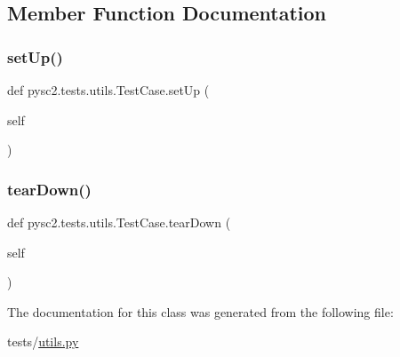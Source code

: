 \subsection{Member Function Documentation}
\mbox{\label{classpysc2_1_1tests_1_1utils_1_1_test_case_a2b119fadd4e4bc8426e9d8649bc8026b}} 
\subsubsection{\texorpdfstring{set\+Up()}{setUp()}}
{\footnotesize\ttfamily def pysc2.\+tests.\+utils.\+Test\+Case.\+set\+Up (\begin{DoxyParamCaption}\item[{}]{self }\end{DoxyParamCaption})}

\mbox{\label{classpysc2_1_1tests_1_1utils_1_1_test_case_acc0033ea0db648be45dc53eaf0dc72b7}} 
\subsubsection{\texorpdfstring{tear\+Down()}{tearDown()}}
{\footnotesize\ttfamily def pysc2.\+tests.\+utils.\+Test\+Case.\+tear\+Down (\begin{DoxyParamCaption}\item[{}]{self }\end{DoxyParamCaption})}



The documentation for this class was generated from the following file\+:\begin{DoxyCompactItemize}
\item 
tests/\mbox{\hyperlink{utils_8py}{utils.\+py}}\end{DoxyCompactItemize}
